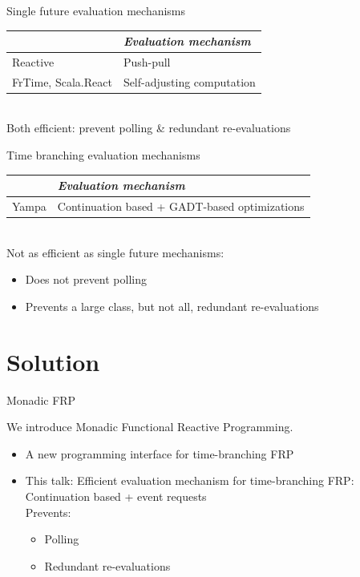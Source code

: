 \documentclass{beamer}
\begin{document}
\begin{frame}{Single future evaluation mechanisms}

\begin{tabular}{l l}
&\emph{Evaluation mechanism} \\
\hline
Reactive & Push-pull \\
FrTime, Scala.React & Self-adjusting computation \\
\end{tabular}\\
\vspace{1cm}
Both efficient: prevent polling \& redundant re-evaluations
\end{frame}


\begin{frame}{Time branching evaluation mechanisms}
\begin{tabular}{l l}
 & \emph{Evaluation mechanism}  \\
\hline
Yampa & Continuation based + GADT-based optimizations  \\
\end{tabular}\\
\vspace{1cm}
Not as efficient as single future mechanisms: 
\begin{itemize}
\item Does not prevent polling
\item Prevents a large class, but not all, redundant re-evaluations
\end{itemize}
\end{frame}
\section{Solution}

\begin{frame}{Monadic FRP}

We introduce Monadic Functional Reactive Programming.
\begin{itemize}
\item A new programming interface for time-branching  FRP
\item \alert{This talk:} Efficient evaluation mechanism for time-branching FRP: \\
 Continuation based + event requests\\
Prevents:
\begin{itemize}
\item Polling
\item Redundant re-evaluations
\end{itemize}
\end{itemize}
\end{frame}
\end{document}
